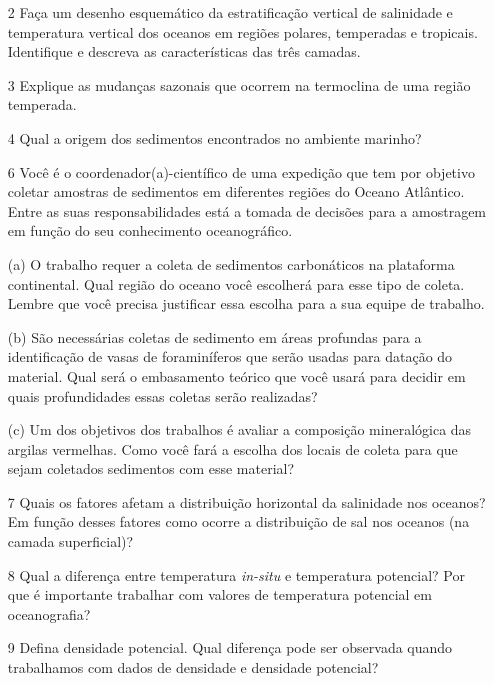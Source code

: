 \documentclass[a4paper,10pt]{article}
\begin{document}
\begin{itemize}
  \newpage
  
  \item[2] Faça um desenho esquemático da estratificação vertical de salinidade e temperatura vertical dos oceanos em regiões polares, temperadas e tropicais. Identifique e descreva as características das três camadas. 
  
  \item[3] Explique as mudanças sazonais que ocorrem na termoclina de uma região temperada.
  
  \item[4] Qual a origem dos sedimentos encontrados no ambiente marinho? 
  
  \item[6] Você é o coordenador(a)-científico de uma expedição que tem por objetivo coletar amostras de sedimentos em diferentes regiões do Oceano Atlântico. Entre as suas responsabilidades está a tomada de decisões para a amostragem em função do seu conhecimento oceanográfico.
  \item[(a)] O trabalho requer a coleta de sedimentos carbonáticos na plataforma continental. Qual região do oceano você escolherá para esse tipo de coleta. Lembre que você precisa justificar essa escolha para a sua equipe de trabalho.
  \item[(b)] São necessárias coletas de sedimento em áreas profundas para a identificação de vasas de foraminíferos que serão usadas para datação do material. Qual será o embasamento teórico que você usará para decidir em quais profundidades essas coletas serão realizadas?
  \item[(c)] Um dos objetivos dos trabalhos é avaliar a composição mineralógica das argilas vermelhas. Como você fará a escolha dos locais de coleta para que sejam coletados sedimentos com esse material?
    
  \item[7] Quais os fatores afetam a distribuição horizontal da salinidade nos oceanos? Em função desses fatores como ocorre a distribuição de sal nos oceanos (na camada superficial)?
  
  \item[8] Qual a diferença entre temperatura {\it in-situ} e temperatura potencial? Por que é importante trabalhar com valores de temperatura potencial em oceanografia?
  
  \item[9] Defina densidade potencial. Qual diferença pode ser observada quando trabalhamos com dados de densidade e densidade potencial?
  
  
  \end{itemize}
\end{document}
